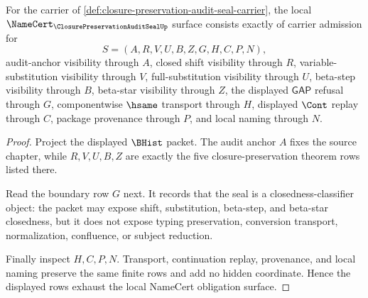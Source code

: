 \begin{theorem}
\label{thm:closure-preservation-audit-seal-namecert-obligations}
For the carrier of \autoref{def:closure-preservation-audit-seal-carrier}, the local $\NameCert_{\ClosurePreservationAuditSealUp}$ surface consists exactly of carrier admission for
$$
S=(A,R,V,U,B,Z,G,H,C,P,N),
$$
audit-anchor visibility through $A$, closed shift visibility through $R$, variable-substitution visibility through $V$, full-substitution visibility through $U$, beta-step visibility through $B$, beta-star visibility through $Z$, the displayed $\mathsf{GAP}$ refusal through $G$, componentwise $\hsame$ transport through $H$, displayed $\Cont$ replay through $C$, package provenance through $P$, and local naming through $N$.
\end{theorem}
\begin{proof}
Project the displayed $\BHist$ packet. The audit anchor $A$ fixes the source chapter, while $R,V,U,B,Z$ are exactly the five closure-preservation theorem rows listed there.

Read the boundary row $G$ next. It records that the seal is a closedness-classifier object: the packet may expose shift, substitution, beta-step, and beta-star closedness, but it does not expose typing preservation, conversion transport, normalization, confluence, or subject reduction.

Finally inspect $H,C,P,N$. Transport, continuation replay, provenance, and local naming preserve the same finite rows and add no hidden coordinate. Hence the displayed rows exhaust the local NameCert obligation surface.
\end{proof}

